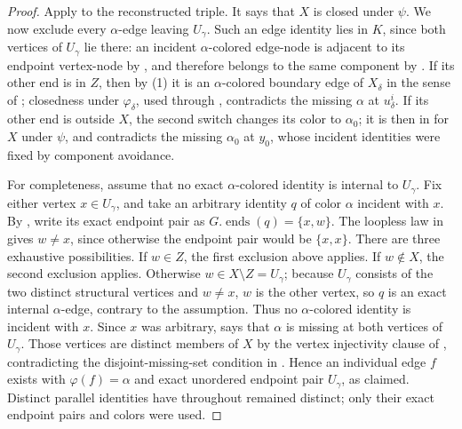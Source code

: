 \begin{proof}
Apply  to the reconstructed triple.  It
says that $X$ is closed under $\psi$.  We now exclude every
$\alpha$-edge leaving $U_\gamma$.  Such an edge identity lies in $K$, since
both vertices of $U_\gamma$ lie there: an incident $\alpha$-colored
edge-node is adjacent to its endpoint vertex-node by
, and therefore belongs to the same
component by .  If its other end is in $Z$, then
by (1) it is an $\alpha$-colored boundary edge of $X_\delta$ in the sense of
; closedness under $\varphi_\delta$, used through
, contradicts the missing $\alpha$ at
$u^i_\delta$.  If its other end is outside $X$, the second switch changes
its color to $\alpha_0$; it is then in  for $X$
under $\psi$, and  contradicts the missing
$\alpha_0$ at $y_0$, whose incident identities were fixed by component
avoidance.

For completeness, assume that no exact $\alpha$-colored identity is
internal to $U_\gamma$.  Fix either vertex $x\in U_\gamma$, and take an
arbitrary identity $q$ of color $\alpha$ incident with $x$.  By
, write its exact endpoint pair as
$G.\operatorname{ends}(q)=\{x,w\}$.  The loopless law in
 gives $w\ne x$, since otherwise the endpoint
pair would be $\{x,x\}$.  There are three exhaustive possibilities.  If
$w\in Z$, the first exclusion above applies.  If $w\notin X$, the second
exclusion applies.  Otherwise $w\in X\setminus Z=U_\gamma$; because
$U_\gamma$ consists of the two distinct structural vertices and $w\ne x$,
$w$ is the other vertex, so $q$ is an exact internal $\alpha$-edge,
contrary to the assumption.  Thus no $\alpha$-colored identity is incident
with $x$.  Since $x$ was arbitrary,  says that
$\alpha$ is missing at both vertices of $U_\gamma$.  Those vertices are
distinct members of $X$ by the vertex injectivity clause of
, contradicting the disjoint-missing-set condition in
.  Hence an individual edge $f$ exists
with $\varphi(f)=\alpha$ and exact unordered endpoint pair $U_\gamma$, as
claimed.  Distinct parallel identities have throughout remained distinct;
only their exact endpoint pairs and colors were used.
\end{proof}
